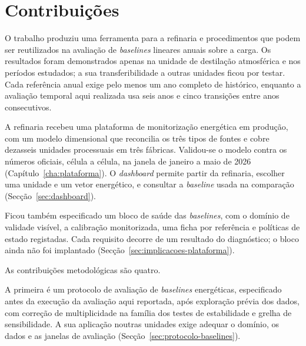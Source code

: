 


\section{Contribuições}
\label{sec:contribuicoes}

O trabalho produziu uma ferramenta para a refinaria e procedimentos
que podem ser reutilizados na avaliação de \emph{baselines} lineares
anuais sobre a carga. Os resultados foram demonstrados apenas na unidade
de destilação atmosférica e nos períodos estudados; a sua
transferibilidade a outras unidades ficou por testar. Cada referência
anual exige pelo menos um ano completo de histórico, enquanto a
avaliação temporal aqui realizada usa seis anos e cinco transições
entre anos consecutivos.

A refinaria recebeu uma plataforma de monitorização energética em
produção, com um modelo dimensional que reconcilia os três tipos de
fontes e cobre dezasseis unidades processuais em três fábricas. Validou-se
o modelo contra os números oficiais, célula a célula, na janela de
janeiro a maio de 2026 (Capítulo~\ref{cha:plataforma}). O
\emph{dashboard} permite partir da refinaria, escolher uma unidade e um
vetor energético, e consultar a \emph{baseline} usada na comparação
(Secção~\ref{sec:dashboard}).

Ficou também especificado um bloco de saúde das \emph{baselines}, com
o domínio de validade visível, a calibração monitorizada, uma ficha por
referência e políticas de estado registadas. Cada requisito decorre de
um resultado do diagnóstico; o bloco ainda não foi implantado
(Secção~\ref{sec:implicacoes-plataforma}).

As contribuições metodológicas são quatro.

A primeira é um protocolo de avaliação de \emph{baselines} energéticas,
especificado antes da execução da avaliação aqui reportada,
após exploração prévia dos dados, com correção de multiplicidade na
família dos testes de estabilidade e grelha de sensibilidade. A sua
aplicação noutras unidades exige adequar o domínio, os dados e as
janelas de avaliação
(Secção~\ref{sec:protocolo-baselines}).

